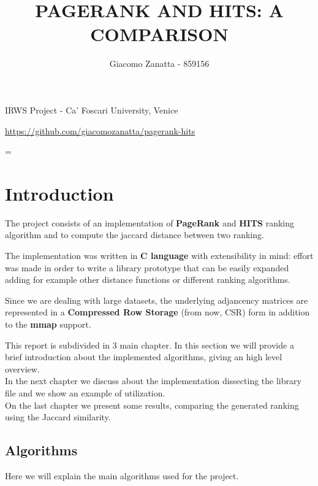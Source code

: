 \documentclass[10pt]{article}
\title{\renewcommand{\baselinestretch}{1.17}\normalsize\bf%
\uppercase{PageRank and HITS: a comparison}
}
\author{
Giacomo Zanatta - 859156
}
\begin{document}
\date{}

\maketitle

\vspace{-0.5cm}

\begin{center}
{\footnotesize 
IRWS Project - Ca' Foscari University, Venice 
}
\end{center}

\bigskip
\noindent
{\small
\url{https://github.com/giacomozanatta/pagerank-hits}
}

\baselineskip=\normalbaselineskip

\section{Introduction}\label{sec:1}
The project \cite{Zanatta_Page_Rank_HITS_2022}consists of an implementation of {\bf PageRank}\cite{Page98thepagerank} and {\bf HITS}\cite{Kleinberg1999} ranking algorithm and to compute the jaccard distance between two ranking.

The implementation was written in {\bf C language} with extensibility in mind: effort was made in order to write a library prototype that can be easily expanded adding for example other distance functions or different ranking algorithms.

Since we are dealing with large datasets, the underlying adjancency matrices are represented in a {\bf Compressed Row Storage} (from now, CSR) form in addition to the {\bf mmap} support.

This report is subdivided in 3 main chapter.  
In this section we will provide a brief introduction about the implemented algorithms, giving an high level overview.\\
In the next chapter we discuss about the implementation dissecting the library file and we show an example of utilization.\\
On the last chapter we present some results, comparing the generated ranking using the Jaccard similarity.

\subsection{Algorithms}
Here we will explain the main algorithms used for the project.
\end{document}
